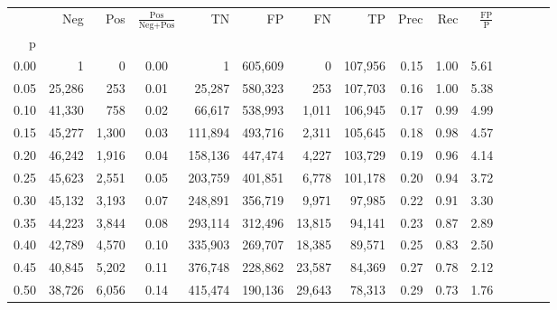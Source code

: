 \begin{tabular}{rrrcrrrrrrrrrrr}
\toprule
{} &     Neg &    Pos & $\frac{\text{Pos}}{\text{Neg}+\text{Pos}}$ &       TN &       FP &       FN &       TP &  Prec &   Rec & $\frac{\text{FP}}{\text{P}}$ \\
p    &         &        &                                            &          &          &          &          &       &       &                              \\
\midrule
0.00 &       1 &      0 &                                       0.00 &        1 &  605,609 &        0 &  107,956 &  0.15 &  1.00 &                         5.61 \\
0.05 &  25,286 &    253 &                                       0.01 &   25,287 &  580,323 &      253 &  107,703 &  0.16 &  1.00 &                         5.38 \\
0.10 &  41,330 &    758 &                                       0.02 &   66,617 &  538,993 &    1,011 &  106,945 &  0.17 &  0.99 &                         4.99 \\
0.15 &  45,277 &  1,300 &                                       0.03 &  111,894 &  493,716 &    2,311 &  105,645 &  0.18 &  0.98 &                         4.57 \\
0.20 &  46,242 &  1,916 &                                       0.04 &  158,136 &  447,474 &    4,227 &  103,729 &  0.19 &  0.96 &                         4.14 \\
0.25 &  45,623 &  2,551 &                                       0.05 &  203,759 &  401,851 &    6,778 &  101,178 &  0.20 &  0.94 &                         3.72 \\
0.30 &  45,132 &  3,193 &                                       0.07 &  248,891 &  356,719 &    9,971 &   97,985 &  0.22 &  0.91 &                         3.30 \\
0.35 &  44,223 &  3,844 &                                       0.08 &  293,114 &  312,496 &   13,815 &   94,141 &  0.23 &  0.87 &                         2.89 \\
0.40 &  42,789 &  4,570 &                                       0.10 &  335,903 &  269,707 &   18,385 &   89,571 &  0.25 &  0.83 &                         2.50 \\
0.45 &  40,845 &  5,202 &                                       0.11 &  376,748 &  228,862 &   23,587 &   84,369 &  0.27 &  0.78 &                         2.12 \\
0.50 &  38,726 &  6,056 &                                       0.14 &  415,474 &  190,136 &   29,643 &   78,313 &  0.29 &  0.73 &                         1.76 \\

\end{tabular}
